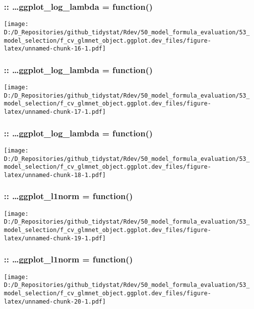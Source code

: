 \documentclass[
]{article}
\begin{document}
\hypertarget{ggplot_log_lambda-function-1}{%
\subsubsection{:: \ldots ggplot\_log\_lambda =
function()}\label{ggplot_log_lambda-function-1}}

\texttt{[image: D:/D\_Repositories/github\_tidystat/Rdev/50\_model\_formula\_evaluation/53\_model\_selection/f\_cv\_glmnet\_object.ggplot.dev\_files/figure-latex/unnamed-chunk-16-1.pdf]}

\hypertarget{ggplot_log_lambda-function-2}{%
\subsubsection{:: \ldots ggplot\_log\_lambda =
function()}\label{ggplot_log_lambda-function-2}}

\texttt{[image: D:/D\_Repositories/github\_tidystat/Rdev/50\_model\_formula\_evaluation/53\_model\_selection/f\_cv\_glmnet\_object.ggplot.dev\_files/figure-latex/unnamed-chunk-17-1.pdf]}

\hypertarget{ggplot_log_lambda-function-3}{%
\subsubsection{:: \ldots ggplot\_log\_lambda =
function()}\label{ggplot_log_lambda-function-3}}

\texttt{[image: D:/D\_Repositories/github\_tidystat/Rdev/50\_model\_formula\_evaluation/53\_model\_selection/f\_cv\_glmnet\_object.ggplot.dev\_files/figure-latex/unnamed-chunk-18-1.pdf]}

\hypertarget{ggplot_l1norm-function}{%
\subsubsection{:: \ldots ggplot\_l1norm =
function()}\label{ggplot_l1norm-function}}

\texttt{[image: D:/D\_Repositories/github\_tidystat/Rdev/50\_model\_formula\_evaluation/53\_model\_selection/f\_cv\_glmnet\_object.ggplot.dev\_files/figure-latex/unnamed-chunk-19-1.pdf]}

\hypertarget{ggplot_l1norm-function-1}{%
\subsubsection{:: \ldots ggplot\_l1norm =
function()}\label{ggplot_l1norm-function-1}}

\texttt{[image: D:/D\_Repositories/github\_tidystat/Rdev/50\_model\_formula\_evaluation/53\_model\_selection/f\_cv\_glmnet\_object.ggplot.dev\_files/figure-latex/unnamed-chunk-20-1.pdf]}
\end{document}
